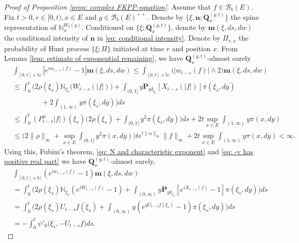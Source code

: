 \documentclass[12pt,a4paper]{amsart}
\theoremstyle{plain}
\theoremstyle{definition}
\numberwithin{equation}{section}
\begin{document}
\begin{proof}[Proof of Proposition \ref{prop: complex FKPP-equation}]
    Assume that $f\in \mathcal B_b(E)$.
    Fix $t>0, r\in [0,t), x\in E$ and $g\in \mathcal B_b(E)^{++}$.
    Denote by $\{\xi, \mathbf n; \mathbf Q_x^{(g,t)}\}$ the spine representation of $\mathbb N_x^{W_t(g)}$.
    Conditioned on $\{\xi; \mathbf Q_x^{(g,t)}\}$, denote by $\mathbf m(\xi, ds,dw)$ the conditional intensity of $\mathbf n$ in \eqref{eq: conditional intensity}.
    Denote by $\Pi_{r,x}$ the probability of Hunt process $\{\xi; \Pi\}$ initiated at time $r$ and position $x$.
    From Lemma \ref{lem: estimate of exponential remaining}, we have $\mathbf Q^{(g,t)}_{x}$-almost surely
\begin{equation}\begin{split}
&\int_{[0,t]\times \mathbb W}|e^{i w_{t-s}(f)} - 1| \mathbf m(\xi, ds,dw)
    \leq \int_{[0,t]\times \mathbb W}\big(| w_{t-s}(f)| \wedge 2\big) \mathbf m(\xi, ds,dw)
    \\&\leq \int_0^t \Big(2\rho(\xi_s)\mathbb N_{\xi_s}\big( W_{t-s}(|f|)\big)  + \int_{(0,1]} y \mathbf P_{y \delta_{\xi_s}}[ X_{t-s}(|f|)] \pi(\xi_s,dy)
    \\&\qquad\qquad+ 2\int_{(1,\infty)}y\pi(\xi_s,dy)\Big) ds
     \\&\leq \int_0^t (P_{t-s}^\alpha |f|)(\xi_s)\Big(2\rho(\xi_s)  + \int_{(0,1]} y^2 \pi(\xi_s,dy)\Big) ds + 2t \sup_{x\in E}\int_{(1,\infty)}y\pi(x,dy)
    \\&\leq \Big(2\|\rho\|_\infty +\sup_{x\in E}\int_{(0,1]} y^2 \pi(x,dy)\Big) t e^{t\|\alpha\|_\infty}\|f\|_\infty + 2t \sup_{x\in E}\int_{(1,\infty)}y\pi(x,dy)
    < \infty.
\end{split}\end{equation}
    Using this, Fubini's theorem, \eqref{eq: N and characteristic exponent} and \eqref{eq: -v has positive real part} we have $\mathbf Q^{(g,t)}_{x}$-almost surely,
\begin{equation}\begin{split}
    &\int_{[0,t]\times \mathbb N}(e^{i w_{t-s}(f)} - 1) \mathbf m(\xi, ds,dw)
    \\&=\int_0^t \Big(2\rho(\xi_s)\mathbb N_{\xi_s}(e^{i W_{t-s}(f)} - 1)  + \int_{(0,\infty)} y \mathbf P_{y \delta_{\xi_s}}[e^{i X_{t-s}(f)} - 1] \pi(\xi_s,dy)\Big) ds
    \\&=\int_0^t \Big( 2\rho(\xi_s) U_{t-s} f(\xi_s) + \int_{(0,\infty)} y (e^{y U_{t-s}f(\xi_s)} - 1) \pi(\xi_s,dy) \Big) ds
    \\&= -\int_0^t \psi'_0 \big(\xi_s, -U_{t-s}f\big)ds.

\end{split}
\end{equation}
\end{proof}
\end{document}
